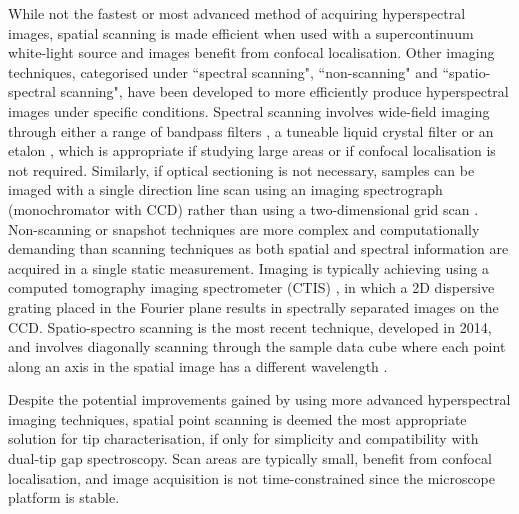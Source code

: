 \documentclass{article}
\begin{document}
While not the fastest or most advanced method of acquiring hyperspectral images, spatial scanning is made efficient when used with a supercontinuum white-light source and images benefit from confocal localisation. Other imaging techniques, categorised under ``spectral scanning", ``non-scanning" and ``spatio-spectral scanning", have been developed to more efficiently produce hyperspectral images under specific conditions.
Spectral scanning involves wide-field imaging through either a range of bandpass filters \cite{iga2012development}, a tuneable liquid crystal filter \cite{slawson1999hyperspectral, gat2000imaging} or an etalon \cite{daly2000tunable}, which is appropriate if studying large areas or if confocal localisation is not required. Similarly, if optical sectioning is not necessary, samples can be imaged with a single direction line scan using an imaging spectrograph (monochromator with CCD) rather than using a two-dimensional grid scan \cite{schultz2001hyperspectral}.
Non-scanning or snapshot techniques are more complex and computationally demanding than scanning techniques as both spatial and spectral information are acquired in a single static measurement. Imaging is typically achieving using a computed tomography imaging spectrometer (CTIS) \cite{okamoto1991simultaneous, bulygin1992spectrotomography, okamoto1993simultaneous, descour1995computed}, in which a 2D dispersive grating placed in the Fourier plane results in spectrally separated images on the CCD.
Spatio-spectro scanning is the most recent technique, developed in 2014, and involves diagonally scanning through the sample data cube where each point along an axis in the spatial image has a different wavelength \cite{grusche2014basic}. %

Despite the potential improvements gained by using more advanced hyperspectral imaging techniques, spatial point scanning is deemed the most appropriate solution for tip characterisation, if only for simplicity and compatibility with dual-tip gap spectroscopy. Scan areas are typically small, benefit from confocal localisation, and image acquisition is not time-constrained since the microscope platform is stable.
\end{document}
